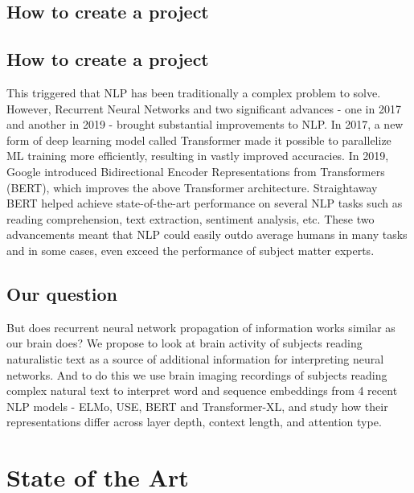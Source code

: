 \documentclass{article}
\begin{document}
  \subsection{How to create a project}




















  \subsection{How to create a project}
This triggered that NLP has been traditionally a complex problem to solve\cite{jones1992natural}. However, Recurrent Neural Networks and two significant advances - one in 2017 and another in 2019 - brought substantial improvements to NLP. In 2017, a new form of deep learning model called Transformer\cite{wang2019r} made it possible to parallelize ML training more efficiently, resulting in vastly improved accuracies.
In 2019, Google introduced Bidirectional Encoder Representations from Transformers (BERT)\cite{kamath2022bidirectional}, which improves the above Transformer architecture. Straightaway BERT helped achieve state-of-the-art performance\cite{DBLP:journals/corr/abs-1810-04805} on several NLP tasks such as reading comprehension, text extraction, sentiment analysis, etc. These two advancements meant that NLP could easily outdo average humans in many tasks and in some cases, even exceed the performance of subject matter experts. 
\subsection{Our question}
But does recurrent neural network propagation of information works similar as our brain does? We propose to look at brain activity of subjects reading naturalistic text as a source of additional information for interpreting neural networks. And to do this we use brain imaging recordings of subjects reading complex natural text to interpret word and sequence embeddings from 4 recent NLP models - ELMo, USE, BERT and Transformer-XL, and study how their representations differ across layer depth, context length, and attention type.

\section{State of the Art}
\label{sec:state_of_the_art}
\end{document}
